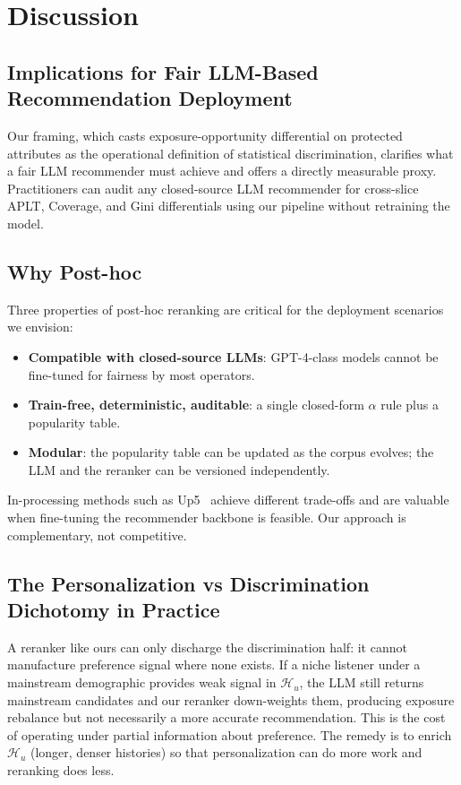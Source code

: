 \section{Discussion}
\label{sec:discussion}

\subsection{Implications for Fair LLM-Based Recommendation Deployment}

Our framing, which casts exposure-opportunity differential on protected attributes as the operational definition of statistical discrimination, clarifies what a fair LLM recommender must achieve and offers a directly measurable proxy. Practitioners can audit any closed-source LLM recommender for cross-slice APLT, Coverage, and Gini differentials using our pipeline without retraining the model.

\subsection{Why Post-hoc}

Three properties of post-hoc reranking are critical for the deployment scenarios we envision:
\begin{itemize}
\item \textbf{Compatible with closed-source LLMs}: GPT-4-class models cannot be fine-tuned for fairness by most operators.
\item \textbf{Train-free, deterministic, auditable}: a single closed-form $\alpha$ rule plus a popularity table.
\item \textbf{Modular}: the popularity table can be updated as the corpus evolves; the LLM and the reranker can be versioned independently.
\end{itemize}

In-processing methods such as Up5~\cite{hua2023up5} achieve different trade-offs and are valuable when fine-tuning the recommender backbone is feasible. Our approach is complementary, not competitive.

\subsection{The Personalization vs Discrimination Dichotomy in Practice}

A reranker like ours can only discharge the discrimination half: it cannot manufacture preference signal where none exists. If a niche listener under a mainstream demographic provides weak signal in $\mathcal{H}_u$, the LLM still returns mainstream candidates and our reranker down-weights them, producing exposure rebalance but not necessarily a more accurate recommendation. This is the cost of operating under partial information about preference. The remedy is to enrich $\mathcal{H}_u$ (longer, denser histories) so that personalization can do more work and reranking does less.

